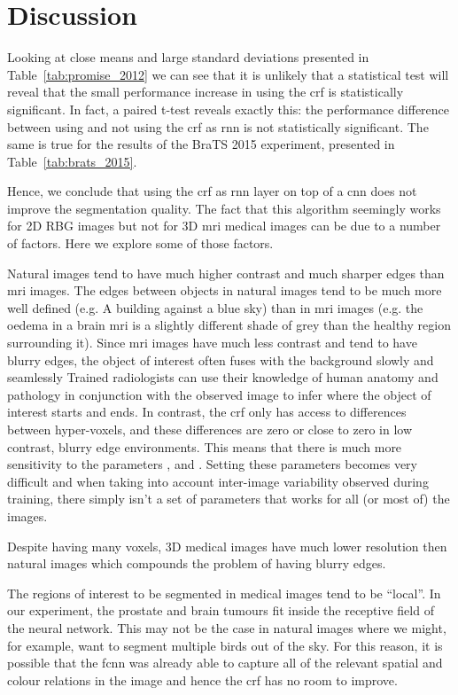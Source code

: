 \documentclass{article}
\begin{document}
\section{Discussion}

Looking at close means and large standard deviations presented in Table~\ref{tab:promise_2012} we can see that it is unlikely that a statistical test will reveal that the small performance increase in using the \gls{crf} is statistically significant. 
In fact, a paired t-test reveals exactly this: the performance difference between using and not using the \gls{crf} as \gls{rnn} is not statistically significant. 
The same is true for the results of the BraTS 2015 experiment, presented in Table~\ref{tab:brats_2015}.

Hence, we conclude that using the \gls{crf} as \gls{rnn} layer on top of a \gls{cnn} does not improve the segmentation quality.
The fact that this algorithm seemingly works for 2D RBG images \cite{CRFasRNN} but not for 3D \gls{mri} medical images can be due to a number of factors. 
Here we explore some of those factors.

Natural images tend to have much higher contrast and much sharper edges than \gls{mri} images.
The edges between objects in natural images tend to be much more well defined (e.g. A building against a blue sky) than in \gls{mri} images (e.g. the oedema in a brain \gls{mri} is a slightly different shade of grey than the healthy region surrounding it).
Since \gls{mri} images have much less contrast and tend to have blurry edges, the object of interest often fuses with the background slowly and seamlessly 
Trained radiologists can use their knowledge of human anatomy and pathology in conjunction with the observed image to infer where the object of interest starts and ends.
In contrast, the \gls{crf} only has access to differences between hyper-voxels, and these differences are zero or close to zero in low contrast, blurry edge environments.
This means that there is much more sensitivity to the parameters ,  and . Setting these parameters becomes very difficult and when taking into account inter-image variability observed during training, there simply isn't a set of  parameters that works for all (or most of) the images. 
    
Despite having many voxels, 3D medical images have much lower resolution then natural images which compounds the problem of having blurry edges.

The regions of interest to be segmented in medical images tend to be ``local''. In our experiment, the prostate and brain tumours fit inside the receptive field of the neural network.
This may not be the case in natural images where we might, for example, want to segment multiple birds out of the sky. 
For this reason, it is possible that the \gls{fcnn} was already able to capture all of the relevant spatial and colour relations in the image and hence the \gls{crf} has no room to improve.
\end{document}
